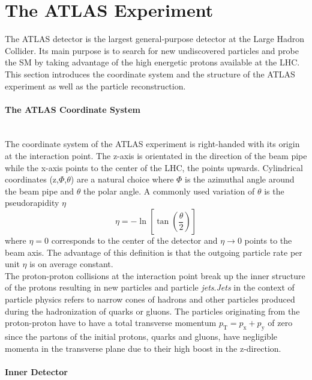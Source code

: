 \section{The ATLAS Experiment} 
\label{ATLAS}
The ATLAS detector is the largest general-purpose detector at the Large Hadron Collider. Its main purpose is to search for new undiscovered particles and probe the SM by taking advantage of the high energetic protons available at the LHC. This section introduces the coordinate system and the structure of the ATLAS experiment as well as the particle reconstruction. \\


\paragraph{The ATLAS Coordinate System} \mbox{} \\
The coordinate system of the ATLAS experiment is right-handed with its origin at the interaction point. The z-axis is orientated in the direction of the beam pipe while the x-axis points to the center of the LHC, the points upwards. Cylindrical coordinates (z,$\Phi$,$\theta$) are a natural choice where $\Phi$ is the azimuthal angle around the beam pipe and $\theta$ the polar angle. A commonly used variation of $\theta$ is the pseudorapidity $\eta$
\begin{equation}
\label{eq:eta}
\eta = - \ln[\tan(\frac{\theta}{2})]
\end{equation}
where $\eta =0$ corresponds to the center of the detector and $\eta \rightarrow 0$ points to the beam axis. The advantage of this definition is that the outgoing particle rate per unit $\eta$ is on average constant. \\
The proton-proton collisions at the interaction point break up the inner structure of the protons resulting in new particles and particle \textit{jets}.\textit{Jets} in the context of particle physics refers to narrow cones of hadrons and other particles produced during the hadronization of quarks or gluons. The particles originating from the proton-proton have to have a total transverse momentum $p_{\text{T}}=p_{\text{x}}+p_{\text{y}}$ of zero since the partons of the initial protons, quarks and gluons, have negligible momenta in the transverse plane due to their high boost in the z-direction.

\paragraph{Inner Detector} \mbox{} \\

